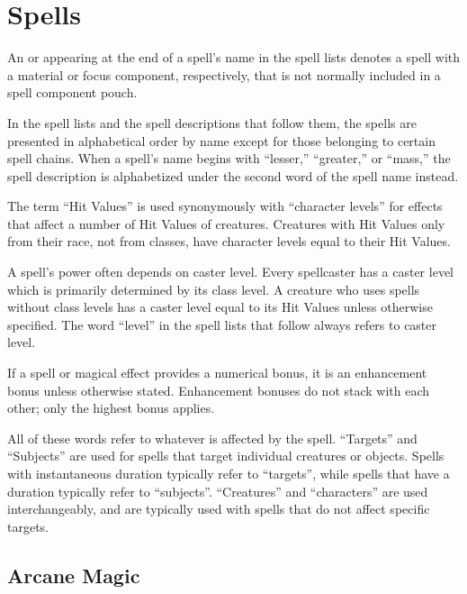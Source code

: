 \chapter{Spells}

An \M{} or \F{} appearing at the end of a spell's name in the spell lists denotes a spell with a material or focus component, respectively, that is not normally included in a spell component pouch.

 In the spell lists and the spell descriptions that follow them, the spells are presented in alphabetical order by name except for those belonging to certain spell chains.
When a spell's name begins with ``lesser,'' ``greater,'' or ``mass,'' the spell description is alphabetized under the second word of the spell name instead.

 The term ``Hit Values'' is used synonymously with ``character levels'' for effects that affect a number of Hit Values of creatures. Creatures with Hit Values only from their race, not from classes, have character levels equal to their Hit Values.

 A spell's power often depends on caster level. Every spellcaster has a caster level which is primarily determined by its class level. A creature who uses spells without class levels has a caster level equal to its Hit Values unless otherwise specified. The word ``level'' in the spell lists that follow always refers to caster level.

 If a spell or magical effect provides a numerical bonus, it is an enhancement bonus unless otherwise stated. Enhancement bonuses do not stack with each other; only the highest bonus applies.

 All of these words refer to whatever is affected by the spell. ``Targets'' and ``Subjects'' are used for spells that target individual creatures or objects. Spells with instantaneous duration typically refer to ``targets'', while spells that have a duration typically refer to ``subjects''. ``Creatures'' and ``characters'' are used interchangeably, and are typically used with spells that do not affect specific targets.

\small

\section{Arcane Magic}\label{Arcane Magic}

